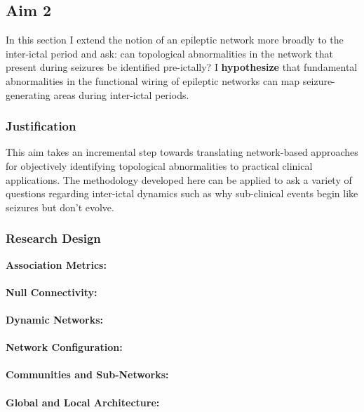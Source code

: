 \subsection{Aim 2}
In this section I extend the notion of an epileptic network more broadly to the inter-ictal period and ask: can topological abnormalities in the network that present during seizures be identified pre-ictally? I \textbf{hypothesize} that fundamental abnormalities in the functional wiring of epileptic networks can map seizure-generating areas during inter-ictal periods.

\subsubsection{Justification}
This aim takes an incremental step towards translating network-based approaches for objectively identifying topological abnormalities to practical clinical applications. The methodology developed here can be applied to ask a variety of questions regarding inter-ictal dynamics such as why sub-clinical events begin like seizures but don't evolve.

\subsubsection{Research Design}
\textbf{Association Metrics:}
~\\
~\\
\textbf{Null Connectivity:}
~\\
~\\
\textbf{Dynamic Networks:}
~\\
~\\
\textbf{Network Configuration:}
~\\
~\\
\textbf{Communities and Sub-Networks:}
~\\
~\\
\textbf{Global and Local Architecture:}


